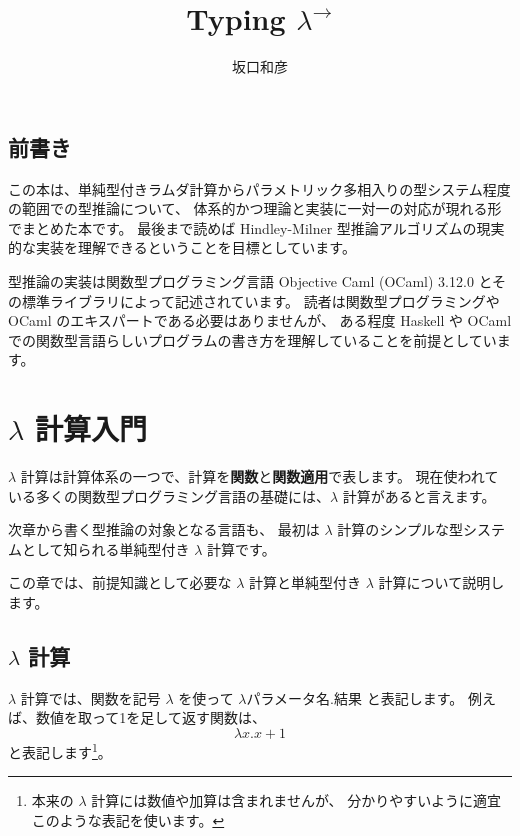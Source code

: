 \documentclass[b5paper]{jsbook}
\title{Typing $\lambda^\to$}
\author{坂口和彦}
\begin{document}


\section*{前書き}

この本は、単純型付きラムダ計算からパラメトリック多相入りの型システム程度の範囲での型推論について、
体系的かつ理論と実装に一対一の対応が現れる形でまとめた本です。
最後まで読めば Hindley-Milner 型推論アルゴリズムの現実的な実装を理解できるということを目標としています。

型推論の実装は関数型プログラミング言語 Objective Caml (OCaml) 3.12.0
とその標準ライブラリによって記述されています。
読者は関数型プログラミングや OCaml のエキスパートである必要はありませんが、
ある程度 Haskell や OCaml での関数型言語らしいプログラムの書き方を理解していることを前提としています。

\tableofcontents

\newpage


\chapter{$\lambda$ 計算入門}

$\lambda$ 計算は計算体系の一つで、計算を\textbf{関数}と\textbf{関数適用}で表します。
現在使われている多くの関数型プログラミング言語の基礎には、$\lambda$ 計算があると言えます。

次章から書く型推論の対象となる言語も、
最初は $\lambda$ 計算のシンプルな型システムとして知られる単純型付き $\lambda$ 計算です。

この章では、前提知識として必要な $\lambda$ 計算と単純型付き $\lambda$ 計算について説明します。

\section{$\lambda$ 計算}

$\lambda$ 計算では、関数を記号 $\lambda$ を使って
$\lambda \text{パラメータ名} . \text{結果}$ と表記します。
例えば、数値を取って1を足して返す関数は、
\[ \lambda x. x+1 \]
と表記します\footnote{本来の $\lambda$ 計算には数値や加算は含まれませんが、
分かりやすいように適宜このような表記を使います。}。
\end{document}
